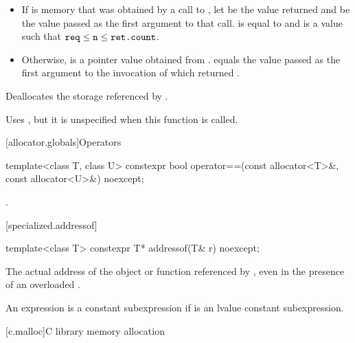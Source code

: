 \begin{itemdescr}
\pnum
\expects
\begin{itemize}
\item
If  is memory that was obtained by a call to ,
let  be the value returned and
 be the value passed as the first argument to that call.
 is equal to  and
 is a value such that $\texttt{\protect req} \leq \texttt{\protect n} \leq \texttt{\protect ret.count}$.
\item
Otherwise,  is a pointer value obtained from .
 equals the value passed as the first argument
to the invocation of  which returned .
\end{itemize}

\pnum
\effects
Deallocates the storage referenced by .

\pnum
\remarks
Uses
,
but it is unspecified
when this function is called.
\end{itemdescr}

[allocator.globals]{Operators}

%
\begin{itemdecl}
template<class T, class U>
  constexpr bool operator==(const allocator<T>&, const allocator<U>&) noexcept;
\end{itemdecl}

\begin{itemdescr}
\pnum
\returns
{}.
\end{itemdescr}

[specialized.addressof]{}

%
\begin{itemdecl}
template<class T> constexpr T* addressof(T& r) noexcept;
\end{itemdecl}

\begin{itemdescr}
\pnum
\returns
The actual address of the object or function referenced by , even in the
presence of an overloaded .

\pnum
\remarks
An expression 
is a constant subexpression
if  is an lvalue constant subexpression.
\end{itemdescr}

[c.malloc]{C library memory allocation}

